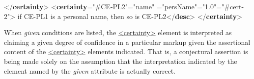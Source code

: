 \begin{shaded}
{</\textbf{certainty}>}\mbox{}\newline 
{<\textbf{certainty}\hspace*{1em}{target}="{\#CE-PL2}"\hspace*{1em}{locus}="{name}"\mbox{}\newline 
\hspace*{1em}{assertedValue}="{persName}"\hspace*{1em}{degree}="{1.0}"\hspace*{1em}{given}="{\#cert-2}">}\mbox{}\newline 
{}if CE-PL1 is a personal name, then so is CE-PL2{</\textbf{desc}>}\mbox{}\newline 
{</\textbf{certainty}>}\end{shaded}\egroup\par \noindent  When {\itshape given} conditions are listed, the \hyperref[TEI.certainty]{<certainty>} element is interpreted as claiming a given degree of confidence in a particular markup given the assertional content of the \hyperref[TEI.certainty]{<certainty>} elements indicated. That is, a conjectural assertion is being made solely on the assumption that the interpretation indicated by the element named by the {\itshape given} attribute is actually correct.\par
